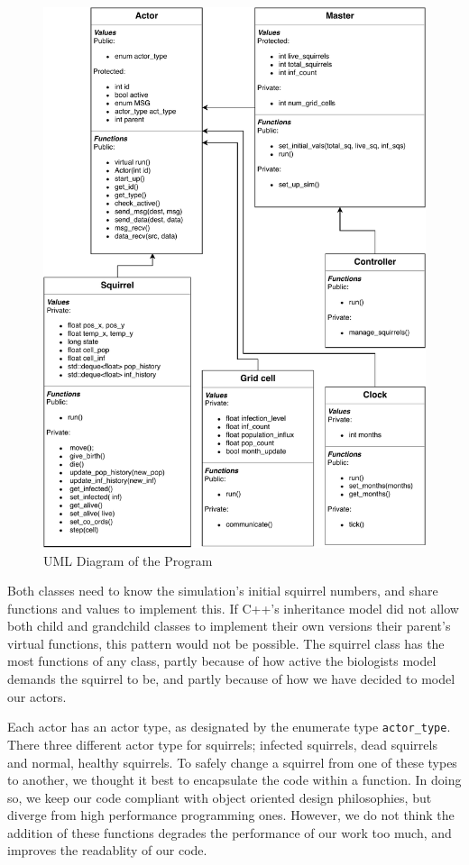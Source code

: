 \documentclass[oneside]{article}
\begin{document}
\begin{figure}[H]
  \includegraphics[width=\linewidth]{figures/pdp_uml}
  \caption{UML Diagram of the Program}
  \label{fig:uml}
\end{figure}

 Both classes need to know the simulation's initial squirrel numbers, and share functions and values to implement this. If C++'s inheritance model did not allow both child and grandchild classes to implement their own versions their parent's virtual functions, this pattern would not be possible. The squirrel class has the most functions of any class, partly because of how active the biologists model demands the squirrel to be, and partly because of how we have decided to model our actors.

 Each actor has an actor type, as designated by the enumerate type \texttt{actor\_type}. There three different actor type for squirrels; infected squirrels, dead squirrels and normal, healthy squirrels. To safely change a squirrel from one of these types to another, we thought it best to encapsulate the code within a function. In doing so, we keep our code compliant with object oriented design philosophies, but diverge from high performance programming ones. However, we do not think the addition of these functions degrades the performance of our work too much, and improves the readablity of our code.
\end{document}
